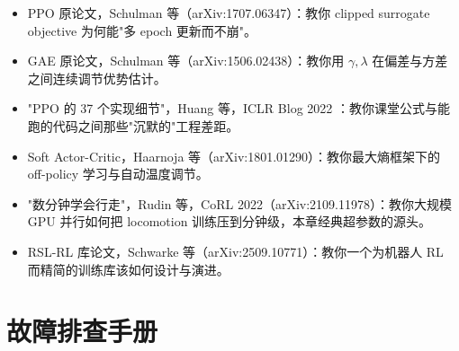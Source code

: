 \begin{itemize}
  \item PPO 原论文，Schulman 等（arXiv:1707.06347）\cite{schulman2017ppo}：教你 clipped surrogate objective 为何能"多 epoch 更新而不崩"。
  \item GAE 原论文，Schulman 等（arXiv:1506.02438）\cite{schulman2015gae}：教你用 $\gamma,\lambda$ 在偏差与方差之间连续调节优势估计。
  \item "PPO 的 37 个实现细节"，Huang 等，ICLR Blog 2022 \cite{huang2022ppo37}：教你课堂公式与能跑的代码之间那些"沉默的"工程差距。
  \item Soft Actor-Critic，Haarnoja 等（arXiv:1801.01290）\cite{haarnoja2018sac}：教你最大熵框架下的 off-policy 学习与自动温度调节。
  \item "数分钟学会行走"，Rudin 等，CoRL 2022（arXiv:2109.11978）\cite{rudin2022legged}：教你大规模 GPU 并行如何把 locomotion 训练压到分钟级，本章经典超参数的源头。
  \item RSL-RL 库论文，Schwarke 等（arXiv:2509.10771）\cite{schwarke2025rslrl}：教你一个为机器人 RL 而精简的训练库该如何设计与演进。
\end{itemize}

\section*{故障排查手册}
\label{sec:rlmc-train-troubleshoot}

